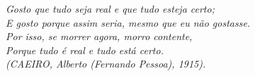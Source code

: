 
\renewcommand{\epigraphname}{EPÍGRAFE}

\begin{epigrafe}

\textit{Gosto que tudo seja real e que tudo esteja certo;\\
E gosto porque assim seria, mesmo que eu não gostasse.\\
Por isso, se morrer agora, morro contente,\\
Porque tudo é real e tudo está certo.\\
(CAEIRO, Alberto (Fernando Pessoa), 1915).}

\end{epigrafe}


